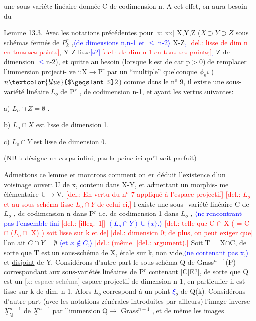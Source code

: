 \documentclass[11pt]{article}
\newcommand{\scanpage}[1]{\par\bigskip\noindent{\small\sffamily[scan #1]}\par}
\newcommand{\mspage}[1]{{\small\sffamily[p.\,#1]}}
\newcommand{\hand}[1]{\textcolor{blue}{#1}}
\let\over\relax
\newcommand{\over}[2]{\textcolor{gray}{#1}\textcolor{blue}{\ensuremath{^{\!\nearrow}}#2}}
\newcommand{\inserted}[2][]{\textcolor{blue}{$\langle$#2$\rangle$}}
\newcommand{\deleted}[1]{\textcolor{red}{[\textsf{del.:} #1]}}
\newcommand{\xout}[1]{\textcolor{gray}{[\textsf{x:} #1]}}
\newcommand{\uline}[1]{\underline{#1}}
\newcommand{\unsure}[1]{[#1?]}
\newcommand{\illegible}[1]{[\textsf{illeg.\ #1}]}
\begin{document}
\clearpage
\scanpage{25/77}
\mspage{\hand{72}}

une sous-variété linéaire donnée C  de codimension n.  A cet effet,
on aura besoin du

\uline{Lemme} 13.3.  Avec les notations précédentes pour \xout{xx} X,Y,Z  ($X\supset Y\supset Z$
sous schémas fermés de $P^r_k$ ,\inserted[typed]{de dimensions n,n-1 et \hand{$\leqslant$} n-2} X-Z\hand{,} \deleted{lisse de dim n en tous ses points},
Y-Z lisse\hand{\unsure{s}} \deleted{de dim n-1 en tous ses points;}\hand{,} Z de dimension \hand{$\leqslant$}n-2), et quitte
au besoin (lorsque k est de car p$>$0)  de remplacer l'immersion projecti-%
ve  i:X$\rightarrow$P$^r$  par  un ``multiple'' quelconque $\phi_n i$ ($n \hand{$\geqslant$} 2$)  comme dans le
n$^o$ 9,  il existe une sous-variété linéaire  $L_o$ de P$^r$ , de codimension
n-1, et ayant les vertus suivantes:

a)  $L_o \cap Z = \emptyset$ .

b)  $L_o \cap X$  est lisse de dimension 1.

c)  $L_o \cap Y$   est lisse de dimension  0.

(NB  k désigne un corps infini, pas la peine ici qu'il soit parfait).

Admettons  ce lemme  et montrons comment on en déduit  l'existence
d'un voisinage ouvert U de x, contenu dans X-Y, et admettant un morphis-%
me élémentaire U$\longrightarrow$V.  \deleted{En vertu du n$^o$ 7 appliqué à l'espace projectif}
\deleted{$L_o$ et au sous-schéma lisse $L_o\cap Y$ de celui-ci,} \over{i}{I}l existe une sous-%
variété linéaire C de $L_o$ , de codimension n dans P$^r$ i.e. de codimension
1 dans $L_o$ , \inserted{ne rencontrant pas l'ensemble fini \deleted{\illegible{1}} $(L_o\cap Y)\cup\{x\}$.} \deleted{telle que C $\cap$ X ( = C $\cap$ ($L_o\cap$ X) ) soit lisse sur k et de}
\deleted{dimension 0; de plus, on peut exiger que} l'on ait  $C \cap Y = \emptyset$ \inserted{et $x\notin C$,} \deleted{(même}
\deleted{argument).} Soit  T = X$\cap$C, de sorte que T est un sous-schéma de X,
étale sur k, non vide,\inserted{ne contenant pas x,} et \uline{disjoint} de Y.  Considérons d'autre part le
sous-schéma Q de Grass$^{n-1}$(P) correspondant aux sous-variétés linéaires
de P$^r$ contenant \unsure{C|E}, de sorte que  Q est un \xout{espace schéma} espace projectif
de dimension n-1,   en particulier il est lisse sur k de dim. n-1.
Alors $L_o$ correspond à un point \hand{$\xi$}$_o$ de Q(k).  Considérons d'autre part
(avec les notations générales introduites par ailleurs)  l'image inverse
$\underline{X}^{n-1}_Q$ de $\underline{X}^{n-1}$  par  l'immersion Q$\longrightarrow$ Grass$^{n-1}$ , et de même les images
\end{document}
